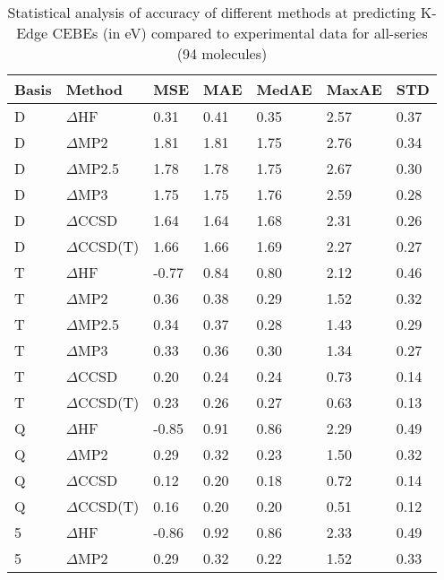 \begin{table}
  \caption{Statistical analysis of accuracy of different methods at predicting K-Edge CEBEs (in eV) compared to experimental data for all-series (94 molecules)}
  \label{tbl:summary-all}
  \begin{tabular}{l l l l l l l }
    \toprule
    \textbf{Basis} & \textbf{Method} & \textbf{MSE} & \textbf{MAE} & \textbf{MedAE} & \textbf{MaxAE} & \textbf{STD} \\ 
    \midrule
    D & $\Delta$HF & 0.31 & 0.41 & 0.35 & 2.57 & 0.37 \\ 
    D & $\Delta$MP2 & 1.81 & 1.81 & 1.75 & 2.76 & 0.34 \\ 
    D & $\Delta$MP2.5 & 1.78 & 1.78 & 1.75 & 2.67 & 0.30 \\ 
    D & $\Delta$MP3 & 1.75 & 1.75 & 1.76 & 2.59 & 0.28 \\ 
    D & $\Delta$CCSD & 1.64 & 1.64 & 1.68 & 2.31 & 0.26 \\ 
    D & $\Delta$CCSD(T) & 1.66 & 1.66 & 1.69 & 2.27 & 0.27 \\ 
    T & $\Delta$HF & -0.77 & 0.84 & 0.80 & 2.12 & 0.46 \\ 
    T & $\Delta$MP2 & 0.36 & 0.38 & 0.29 & 1.52 & 0.32 \\ 
    T & $\Delta$MP2.5 & 0.34 & 0.37 & 0.28 & 1.43 & 0.29 \\ 
    T & $\Delta$MP3 & 0.33 & 0.36 & 0.30 & 1.34 & 0.27 \\ 
    T & $\Delta$CCSD & 0.20 & 0.24 & 0.24 & 0.73 & 0.14 \\ 
    T & $\Delta$CCSD(T) & 0.23 & 0.26 & 0.27 & 0.63 & 0.13 \\ 
    Q & $\Delta$HF & -0.85 & 0.91 & 0.86 & 2.29 & 0.49 \\ 
    Q & $\Delta$MP2 & 0.29 & 0.32 & 0.23 & 1.50 & 0.32 \\ 
    Q & $\Delta$CCSD & 0.12 & 0.20 & 0.18 & 0.72 & 0.14 \\ 
    Q & $\Delta$CCSD(T) & 0.16 & 0.20 & 0.20 & 0.51 & 0.12 \\ 
    5 & $\Delta$HF & -0.86 & 0.92 & 0.86 & 2.33 & 0.49 \\ 
    5 & $\Delta$MP2 & 0.29 & 0.32 & 0.22 & 1.52 & 0.33 \\ 
    \bottomrule
  \end{tabular}
\end{table}

